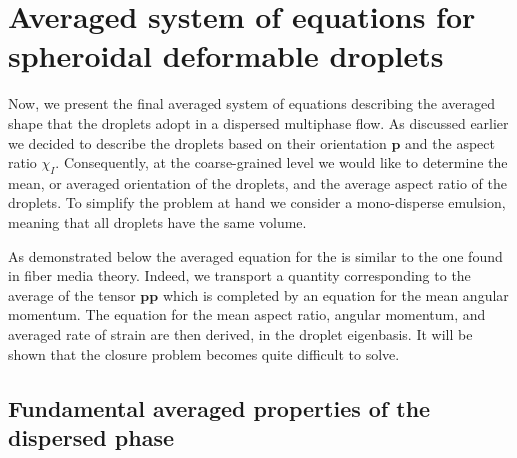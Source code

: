 \section{Averaged system of equations for spheroidal deformable droplets}
\label{sec:averaged_eq}


Now, we present the final averaged system of equations describing the averaged shape that the droplets adopt in a dispersed multiphase flow. 
As discussed earlier we decided to describe the droplets based on their orientation $\textbf{p}$ and the aspect ratio $\chi_I$.
Consequently, at the coarse-grained level we would like to determine the mean, or averaged orientation of the droplets, and the average aspect ratio of the droplets.  
To simplify the problem at hand we consider a mono-disperse emulsion, meaning that all droplets have the same volume. 

As demonstrated below the averaged equation for the is similar to the one found in fiber media theory. 
Indeed, we transport a quantity corresponding to the average of the tensor $\textbf{pp}$ which is completed by an equation for the mean angular momentum. 
The equation for the mean aspect ratio, angular momentum, and averaged rate of strain are then derived, in the droplet eigenbasis.
It will be shown that the closure problem becomes quite difficult to solve. 

\subsection{Fundamental averaged properties of the dispersed phase} 

